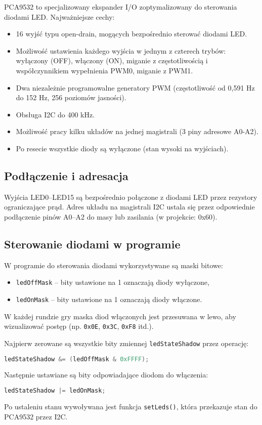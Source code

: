 \documentclass[letterpaper,11pt]{report}
\begin{document}
PCA9532 to specjalizowany ekspander I/O zoptymalizowany do sterowania diodami LED. Najważniejsze cechy:
\begin{itemize}
    \item 16 wyjść typu open-drain, mogących bezpośrednio sterować diodami LED.
    \item Możliwość ustawienia każdego wyjścia w jednym z czterech trybów: wyłączony (OFF), włączony (ON), miganie z częstotliwością i współczynnikiem wypełnienia PWM0, miganie z PWM1.
    \item Dwa niezależnie programowalne generatory PWM (częstotliwość od 0,591 Hz do 152 Hz, 256 poziomów jasności).
    \item Obsługa I2C do 400 kHz.
    \item Możliwość pracy kilku układów na jednej magistrali (3 piny adresowe A0-A2).
    \item Po resecie wszystkie diody są wyłączone (stan wysoki na wyjściach).
\end{itemize}

\subsection{Podłączenie i adresacja}

Wyjścia LED0–LED15 są bezpośrednio połączone z diodami LED przez rezystory ograniczające prąd. Adres układu na magistrali I2C ustala się przez odpowiednie podłączenie pinów A0–A2 do masy lub zasilania (w projekcie: 0x60).

\subsection{Sterowanie diodami w programie}

W programie do sterowania diodami wykorzystywane są maski bitowe:
\begin{itemize}
    \item \texttt{ledOffMask} – bity ustawione na 1 oznaczają diody wyłączone,
    \item \texttt{ledOnMask} – bity ustawione na 1 oznaczają diody włączone.
\end{itemize}
W każdej rundzie gry maska diod włączonych jest przesuwana w lewo, aby wizualizować postęp (np. \texttt{0x0E}, \texttt{0x3C}, \texttt{0xF8} itd.).

Najpierw zerowane są wszystkie bity zmiennej \texttt{ledStateShadow} przez operację:
\begin{lstlisting}[language=C]
ledStateShadow &= (ledOffMask & 0xFFFF);
\end{lstlisting}
Następnie ustawiane są bity odpowiadające diodom do włączenia:
\begin{lstlisting}[language=C]
ledStateShadow |= ledOnMask;
\end{lstlisting}
Po ustaleniu stanu wywoływana jest funkcja \texttt{setLeds()}, która przekazuje stan do PCA9532 przez I2C.
\end{document}
